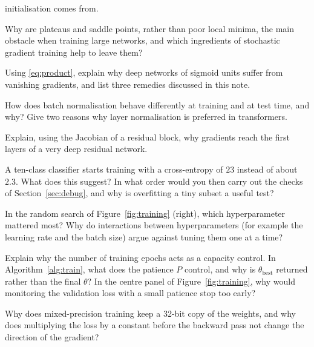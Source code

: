 \documentclass[11pt]{article}
\begin{document}
\begin{questions}
\begin{conceptual}
  initialisation comes from.
\item Why are plateaus and saddle points, rather than poor local minima, the main obstacle when training large networks,
  and which ingredients of stochastic gradient training help to leave them?
\item Using \eqref{eq:product}, explain why deep networks of sigmoid units suffer from vanishing gradients, and list three
  remedies discussed in this note.
\item How does batch normalisation behave differently at training and at test time, and why? Give two reasons why layer
  normalisation is preferred in transformers.
\item Explain, using the Jacobian of a residual block, why gradients reach the first layers of a very deep residual network.
\item A ten-class classifier starts training with a cross-entropy of $23$ instead of about $2.3$. What does this suggest?
  In what order would you then carry out the checks of Section~\ref{sec:debug}, and why is overfitting a tiny subset a
  useful test?
\item In the random search of Figure~\ref{fig:training} (right), which hyperparameter mattered most? Why do interactions
  between hyperparameters (for example the learning rate and the batch size) argue against tuning them one at a time?
\item Explain why the number of training epochs acts as a capacity control. In Algorithm~\ref{alg:train}, what does the
  patience $P$ control, and why is $\theta_{\text{best}}$ returned rather than the final $\theta$? In the centre panel of
  Figure~\ref{fig:training}, why would monitoring the validation loss with a small patience stop too early?
\item Why does mixed-precision training keep a 32-bit copy of the weights, and why does multiplying the loss by a constant
  before the backward pass not change the direction of the gradient?
\end{conceptual}


\end{questions}
\end{document}
